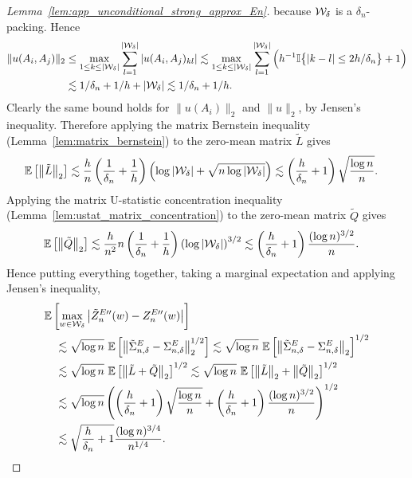 \begin{proof}[Lemma~\ref{lem:app_unconditional_strong_approx_En}]
  because $\mathcal{W}_\delta$
  is a $\delta_n$-packing.
  Hence
  \begin{align*}
    \|u(A_i, A_j)\|_2
    &\leq
    \max_{1 \leq k \leq |\mathcal{W}_\delta|}
    \sum_{l=1}^{|\mathcal{W}_\delta|}
    |u(A_i, A_j)_{kl}|
    \lesssim
    \max_{1 \leq k \leq |\mathcal{W}_\delta|}
    \sum_{l=1}^{|\mathcal{W}_\delta|}
    \Big(
      h^{-1}
      \mathbb{I}\big\{ |k-l| \leq 2h/\delta_n \big\}
      + 1
    \Big) \\
    &\lesssim
    1/\delta_n
    + 1/h
    + |\mathcal{W}_\delta|
    \lesssim
    1/\delta_n
    + 1/h.
  \end{align*}
  Clearly the same bound holds for
  $\|u(A_i)\|_2$
  and $\|u\|_2$, by Jensen's inequality.
  Therefore applying the matrix Bernstein inequality
  (Lemma~\ref{lem:matrix_bernstein})
  to the zero-mean matrix $\tilde L$ gives
  \begin{align*}
    \mathbb{E}\left[
      \left\|
      \tilde L
      \right\|_2
    \right]
    &\lesssim
    \frac{h}{n}
    \left(\frac{1}{\delta_n} + \frac{1}{h} \right)
    \left(
      \log |\mathcal{W}_\delta| + \sqrt{n \log |\mathcal{W}_\delta|}
    \right)
    \lesssim
    \left(\frac{h}{\delta_n} + 1 \right)
    \sqrt{\frac{\log n}{n}}.
  \end{align*}
  Applying the matrix U-statistic concentration inequality
  (Lemma~\ref{lem:ustat_matrix_concentration})
  to the zero-mean matrix $\tilde Q$ gives
  \begin{align*}
    \mathbb{E}\left[
      \left\|
      \tilde Q
      \right\|_2
    \right]
    &\lesssim
    \frac{h}{n^2}
    n
    \left(\frac{1}{\delta_n} + \frac{1}{h} \right)
    \left(
      \log |\mathcal{W}_\delta|
    \right)^{3/2}
    \lesssim
    \left(\frac{h}{\delta_n} + 1 \right)
    \frac{(\log n)^{3/2}}{n}.
  \end{align*}
  Hence putting everything together,
  taking a marginal expectation
  and applying Jensen's inequality,
  \begin{align*}
    &\mathbb{E}\left[
      \max_{w \in \mathcal{W}_\delta}
      \big|\tilde Z_n^{E\prime\prime}(w) - Z_n^{E\prime\prime}(w)\big|
    \right] \\
    &\quad\lesssim
    \sqrt{\log n} \
    \mathbb{E}\left[
      \left\|
      \tilde\Sigma^E_{n,\delta} - \Sigma^E_{n,\delta}
      \right\|_2^{1/2}
    \right]
    \lesssim
    \sqrt{\log n} \
    \mathbb{E}\left[
      \left\|
      \tilde\Sigma^E_{n,\delta} - \Sigma^E_{n,\delta}
      \right\|_2
    \right]^{1/2} \\
    &\quad\lesssim
    \sqrt{\log n} \
    \mathbb{E}\left[
      \left\|
      \tilde L
      + \tilde Q
      \right\|_2
    \right]^{1/2}
    \lesssim
    \sqrt{\log n} \
    \mathbb{E}\left[
      \left\|
      \tilde L
      \right\|_2
      + \left\|
      \tilde Q
      \right\|_2
    \right]^{1/2} \\
    &\quad\lesssim
    \sqrt{\log n}
    \left(
      \left(\frac{h}{\delta_n} + 1 \right)
      \sqrt{\frac{\log n}{n}}
      + \left(\frac{h}{\delta_n} + 1 \right)
      \frac{(\log n)^{3/2}}{n}
    \right)^{1/2} \\
    &\quad\lesssim
    \sqrt{\frac{h}{\delta_n} + 1}
    \frac{(\log n)^{3/4}}{n^{1/4}}.
  \end{align*}


\end{proof}
